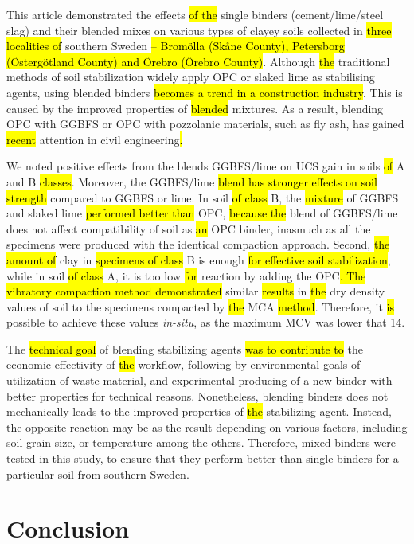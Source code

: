 \documentclass[electronics,article,submit,pdftex,moreauthors]{Definitions/mdpi}
\begin{document}
	This article demonstrated the effects \hl{of the} single binders (cement/lime/steel slag) and their blended mixes on various types of clayey soils collected in \hl{three localities of} southern Sweden \hl{-- Brom\"olla (Sk\aa ne County), Petersborg (\"Osterg\"otland County) and \"Orebro (\"Orebro County)}. Although \hl{the} traditional methods of soil stabilization widely apply OPC or slaked lime as stabilising agents,\hl{ }using blended binders\hl{ becomes a trend in a construction industry}. This is caused by the improved properties of \hl{blended} mixtures. As a result, blending OPC with GGBFS or OPC with pozzolanic materials, such as fly ash, has gained \hl{recent} attention in civil engineering\hl{. }
	
	We noted positive effects from the blends GGBFS/lime on UCS gain in soils \hl{of} A and B \hl{classes}. Moreover, the GGBFS/lime \hl{blend has stronger effects on soil strength} compared to\hl{ }GGBFS or lime. In soil \hl{of class} B, the \hl{mixture} of GGBFS and slaked lime \hl{performed better than }OPC, \hl{because the} blend of GGBFS/lime does not affect compatibility of soil as \hl{an} OPC binder, inasmuch as all the specimens were produced with the identical compaction approach. Second, \hl{the amount of} clay in \hl{specimens of class} B is enough \hl{for effective soil stabilization}, while in soil \hl{of class} A, it is too low \hl{for} reaction\hl{ }by adding the OPC\hl{. The vibratory compaction method demonstrated} similar \hl{results} in \hl{the} dry density values of soil\hl{ }to the specimens compacted by \hl{the }MCA \hl{method}. Therefore, it \hl{is} possible to achieve these values \emph{in-situ}, as the maximum MCV was lower that 14.
	
	The \hl{technical goal} of blending stabilizing agents \hl{was to contribute to} the economic effectivity of \hl{the} workflow, following by environmental goals of utilization of waste material, and experimental producing of a new binder with better properties for technical reasons. Nonetheless, blending binders does not mechanically leads to the improved properties of \hl{the} stabilizing agent. Instead, the opposite reaction may be as the result depending on various factors, including soil grain size, or temperature among the others. Therefore, mixed binders were tested in this study, to ensure that they perform better than single binders for a particular soil from southern Sweden.

\section{Conclusion}
\end{document}
